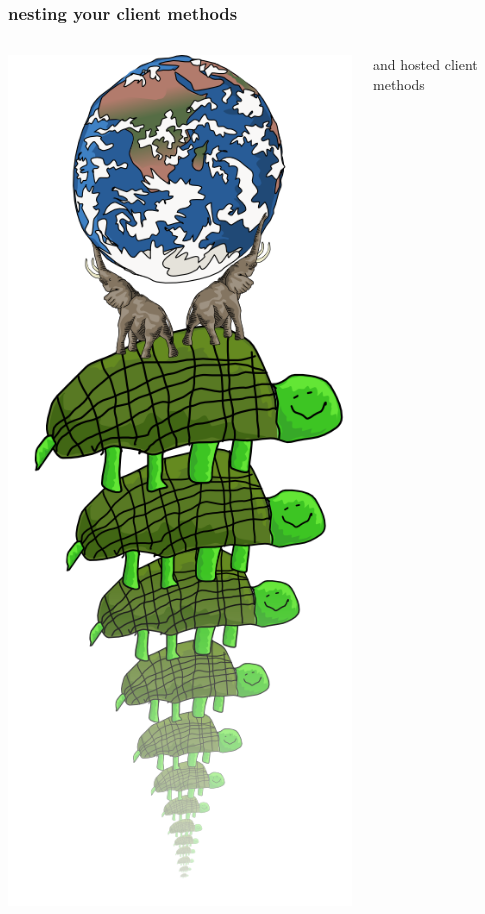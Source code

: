 \documentclass{beamer}
\begin{document}
\begin{frame}
    \frametitle{nesting your client methods}
    \begin{columns}[c]
        \includegraphics[scale=0.28]{images/all_the_way_down.png}
        \begin{center}
        \fbox{}
        \newline
        
        \huge
        and hosted client methods
        
        \end{center}
    \end{columns}
\end{frame}
\end{document}
